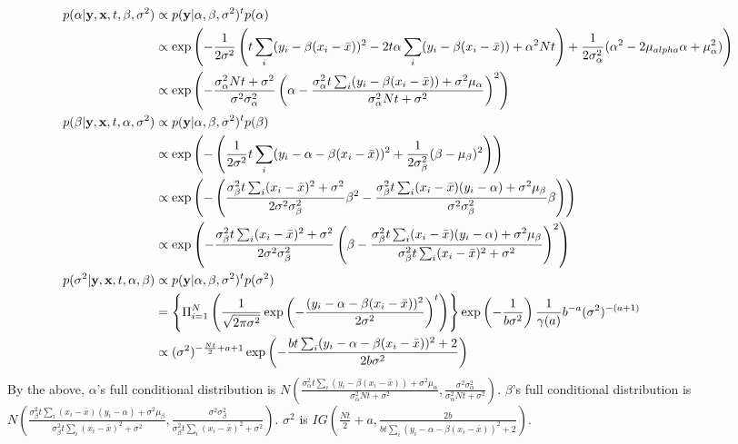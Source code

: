 \documentclass{article}
\begin{document}
\begin{align*}
	p(\alpha | {\bf y}, {\bf x}, t, \beta, \sigma^2) &\propto p({\bf y} | \alpha, \beta, \sigma^2)^t p(\alpha) \\
		&\propto \exp \left( - \frac{1}{2\sigma^2} \left( t \sum_i (y_i - \beta(x_i - \bar{x}))^2 - 2t \alpha \sum_i (y_i - \beta(x_i - \bar{x}))  + \alpha^2 Nt \right) + \frac{1}{2\sigma_{\alpha}^2} (\alpha^2 - 2\mu_{alpha} \alpha + \mu_{\alpha}^2)\right)\\
		&\propto \exp \left( -\frac{\sigma_{\alpha}^2 Nt + \sigma^2}{\sigma^2 \sigma_{\alpha}^2} \left( \alpha - \frac{\sigma_{\alpha}^2 t \sum_i (y_i - \beta(x_i -\bar{x})) + \sigma^2 \mu_{\alpha}}{\sigma_{\alpha}^2 Nt + \sigma^2} \right)^2 \right)\\
	p(\beta | {\bf y}, {\bf x}, t, \alpha, \sigma^2) &\propto p({\bf y} | \alpha, \beta, \sigma^2)^t p(\beta)\\
		&\propto \exp \left( - \left( \frac{1}{2\sigma^2} t\sum_i (y_i - \alpha - \beta(x_i -\bar{x}))^2 + \frac{1}{2\sigma_{\beta}^2} (\beta - \mu_{\beta})^2 \right)\right)\\
		&\propto \exp \left( - \left( \frac{\sigma_{\beta}^2 t \sum_i (x_i - \bar{x})^2 + \sigma^2}{2\sigma^2 \sigma_{\beta}^2} \beta^2 - \frac{\sigma_{\beta}^2 t \sum_i (x_i- \bar{x})(y_i - \alpha) + \sigma^2 \mu_{\beta}}{\sigma^2 \sigma_{\beta}^2} \beta \right) \right)\\
		&\propto \exp \left( - \frac{\sigma_{\beta}^2 t \sum_i (x_i - \bar{x})^2 + \sigma^2}{2\sigma^2 \sigma_{\beta}^2} \left( \beta - \frac{\sigma_{\beta}^2 t \sum_i (x_i- \bar{x})(y_i - \alpha) + \sigma^2 \mu_{\beta}}{\sigma_{\beta}^2 t \sum_i (x_i - \bar{x})^2 + \sigma^2}\right)^2 \right)\\
	p(\sigma^2 | {\bf y}, {\bf x}, t, \alpha, \beta) &\propto p({\bf y} | \alpha, \beta, \sigma^2)^t p(\sigma^2) \\
		&= \left\{ \Pi_{i=1}^{N} \left( \frac{1}{\sqrt{2\pi \sigma^2}} \exp \left( - \frac{(y_i - \alpha - \beta(x_i - \bar{x}))^2}{2\sigma^2}\right)^t \right) \right\} \exp \left( -\frac{1}{b \sigma^2} \right) \frac{1}{\gamma(a)} b^{-a} (\sigma^2)^{-(a + 1)}\\
		&\propto (\sigma^2)^{-\frac{Nt}{2} + a + 1} \exp \left( - \frac{bt \sum_i (y_i - \alpha - \beta(x_i -\bar{x}))^2 + 2}{2b\sigma^2} \right)\\
\end{align*}
By the above, $\alpha$'s full conditional distribution is $N \left(\frac{\sigma_{\alpha}^2 t \sum_i (y_i - \beta(x_i -\bar{x})) + \sigma^2 \mu_{\alpha}}{\sigma_{\alpha}^2 Nt + \sigma^2}, \frac{\sigma^2 \sigma_{\alpha}^2}{\sigma_{\alpha}^2 Nt + \sigma^2} \right)$. $\beta$'s full conditional distribution is $N\left( \frac{\sigma_{\beta}^2 t \sum_i (x_i- \bar{x})(y_i - \alpha) + \sigma^2 \mu_{\beta}}{\sigma_{\beta}^2 t \sum_i (x_i - \bar{x})^2 + \sigma^2}, \frac{\sigma^2 \sigma_{\beta}^2}{\sigma_{\beta}^2 t \sum_i (x_i - \bar{x})^2 + \sigma^2} \right)$. $\sigma^2$ is $IG\left( \frac{Nt}{2} + a, \frac{2b}{bt \sum_i (y_i - \alpha - \beta(x_i -\bar{x}))^2 + 2} \right)$. 
\end{document}
